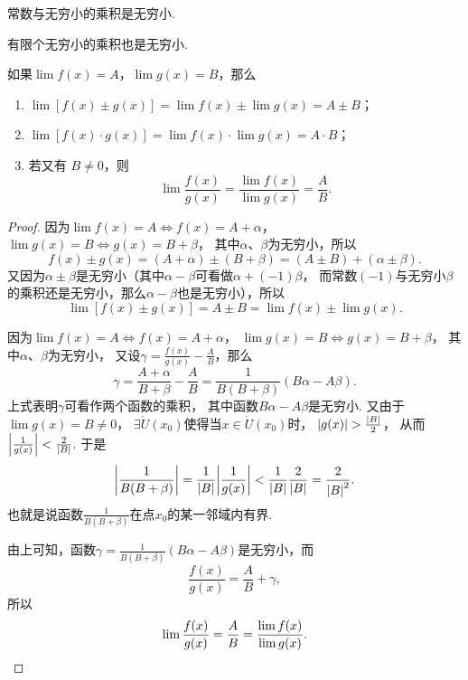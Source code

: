 \begin{corollary}
常数与无穷小的乘积是无穷小.
\end{corollary}

\begin{corollary}
有限个无穷小的乘积也是无穷小.
\end{corollary}

\begin{theorem}\label{theorem:极限.极限的四则运算法则}
如果\(\lim f(x)=A\)，\(\lim g(x)=B\)，那么\begin{enumerate}
	\item \(\lim [f(x) \pm g(x)] = \lim f(x) \pm \lim g(x) = A \pm B\)；
	\item \(\lim [f(x) \cdot g(x)] = \lim f(x) \cdot \lim g(x) = A \cdot B\)；
	\item 若又有 \(B \neq 0\)，则\[
		\lim \frac{f(x)}{g(x)} = \frac{\lim f(x)}{\lim g(x)} = \frac{A}{B}.
	\]
\end{enumerate}
\begin{proof}
因为\(\lim f(x)=A \iff f(x)=A+\alpha\)，\(\lim g(x)=B \iff g(x)=B+\beta\)，
其中\(\alpha\)、\(\beta\)为无穷小，所以\[
	f(x) \pm g(x) = (A+\alpha)\pm(B+\beta) = (A \pm B) + (\alpha \pm \beta).
\]
又因为\(\alpha\pm\beta\)是无穷小（其中\(\alpha-\beta\)可看做\(\alpha+(-1)\beta\)，
而常数\((-1)\)与无穷小\(\beta\)的乘积还是无穷小，那么\(\alpha-\beta\)也是无穷小），所以\[
	\lim [f(x) \pm g(x)] = A \pm B = \lim f(x) \pm \lim g(x).
\]

因为\(\lim f(x)=A \iff f(x)=A+\alpha\)，
\(\lim g(x)=B \iff g(x)=B+\beta\)，
其中\(\alpha\)、\(\beta\)为无穷小，
又设\(\gamma = \frac{f(x)}{g(x)} - \frac{A}{B}\)，那么\[
	\gamma = \frac{A+\alpha}{B+\beta} - \frac{A}{B}
	= \frac{1}{B(B+\beta)} (B \alpha - A \beta).
\]
上式表明\(\gamma\)可看作两个函数的乘积，
其中函数\(B \alpha - A \beta\)是无穷小.
又由于\(\lim g(x) = B \neq 0\)，
\(\exists \mathring{U}(x_0)\)使得当\(x\in\mathring{U}(x_0)\)时，
\(\abs{g(x)}>\frac{\abs{B}}{2}\)，
从而\(\abs{\frac{1}{g(x)}}<\frac{2}{\abs{B}}\).
于是\[
	\abs{\frac{1}{B(B+\beta)}}
	=\frac{1}{\abs{B}} \abs{\frac{1}{g(x)}}
	<\frac{1}{\abs{B}} \frac{2}{\abs{B}}
	=\frac{2}{\abs{B}^2}.
\]
也就是说函数\(\frac{1}{B(B+\beta)}\)在点\(x_0\)的某一邻域内有界.

由上可知，函数\(\gamma = \frac{1}{B(B+\beta)} (B \alpha - A \beta)\)是无穷小，而\[
\frac{f(x)}{g(x)} = \frac{A}{B} + \gamma,
\]所以\[
\lim\frac{f(x)}{g(x)} = \frac{A}{B} = \frac{\lim f(x)}{\lim g(x)}.
\qedhere
\]
\end{proof}
\end{theorem}

